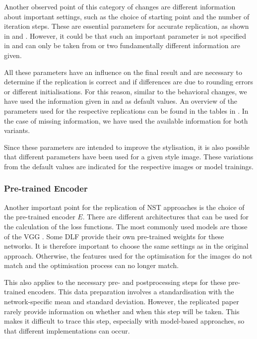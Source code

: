 Another observed point of this category of changes are different information about important settings, such as the choice of starting point and the number of iteration steps. These are essential parameters for accurate replication, as shown in  and . However, it could be that such an important parameter is not specified in \paper{} and can only be taken from \implementation{} or two fundamentally different information are given.  

All these parameters have an influence on the final result and are necessary to determine if the replication is correct and if differences are due to rounding errors or different initialisations. For this reason, similar to the behavioral changes, we have used the information given in \paper{} and \implementation{} as default values. An overview of the parameters used for the respective replications can be found in the tables in . In the case of missing information, we have used the available information for both variants. 

Since these parameters are intended to improve the stylisation, it is also possible that different parameters have been used for a given style image. These variations from the default values are indicated for the respective images or model trainings.

\subsubsection{Pre-trained Encoder}
Another important point for the replication of \gls{NST} approaches is the choice of the pre-trained encoder $E$. There are different architectures that can be used for the calculation of the loss functions. The most commonly used models are those of the \gls{VGG} \cite{SZ2015}. Some \gls{DLF} provide their own pre-trained weights for these networks. It is therefore important to choose the same settings as in the original approach. Otherwise, the features used for the optimisation for the images do not match and the optimisation process can no longer match.

This also applies to the necessary pre- and postprocessing steps for these pre-trained encoders. This data preparation involves a standardisation with the network-specific mean and standard deviation. However, the replicated paper rarely provide information on whether and when this step will be taken. This makes it difficult to trace this step, especially with model-based approaches, so that different implementations can occur.  

